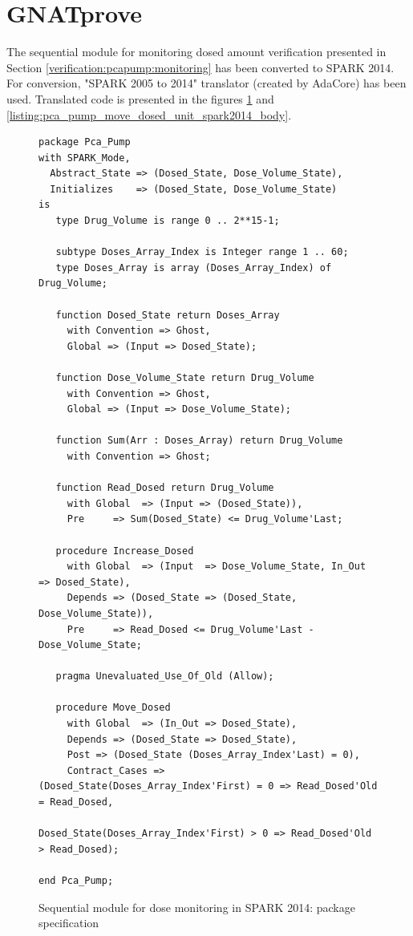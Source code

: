 \section{GNATprove}
\label{verification:gnatprove}

The sequential module for monitoring dosed amount verification presented in Section \ref{verification:pcapump:monitoring} has been converted to SPARK 2014. For conversion, "SPARK 2005 to 2014" translator (created by AdaCore) has been used. Translated code is presented in the figures \ref{listing:pca_pump_move_dosed_unit_spark2014_spec} and \ref{listing:pca_pump_move_dosed_unit_spark2014_body}.

\begin{figure}
\singlespacing
\begin{lstlisting}[language=ada2012, frame=single, gobble=0]
package Pca_Pump
with SPARK_Mode,
  Abstract_State => (Dosed_State, Dose_Volume_State),
  Initializes    => (Dosed_State, Dose_Volume_State)
is
   type Drug_Volume is range 0 .. 2**15-1;

   subtype Doses_Array_Index is Integer range 1 .. 60;
   type Doses_Array is array (Doses_Array_Index) of Drug_Volume;

   function Dosed_State return Doses_Array
     with Convention => Ghost,
     Global => (Input => Dosed_State);

   function Dose_Volume_State return Drug_Volume
     with Convention => Ghost,
     Global => (Input => Dose_Volume_State);

   function Sum(Arr : Doses_Array) return Drug_Volume
     with Convention => Ghost;

   function Read_Dosed return Drug_Volume
     with Global  => (Input => (Dosed_State)),
     Pre     => Sum(Dosed_State) <= Drug_Volume'Last;

   procedure Increase_Dosed
     with Global  => (Input  => Dose_Volume_State, In_Out => Dosed_State),
     Depends => (Dosed_State => (Dosed_State, Dose_Volume_State)),
     Pre     => Read_Dosed <= Drug_Volume'Last - Dose_Volume_State;

   pragma Unevaluated_Use_Of_Old (Allow);

   procedure Move_Dosed
     with Global  => (In_Out => Dosed_State),
     Depends => (Dosed_State => Dosed_State),
     Post => (Dosed_State (Doses_Array_Index'Last) = 0),
     Contract_Cases => (Dosed_State(Doses_Array_Index'First) = 0 => Read_Dosed'Old = Read_Dosed,
                        Dosed_State(Doses_Array_Index'First) > 0 => Read_Dosed'Old > Read_Dosed);
     
end Pca_Pump;
\end{lstlisting}
\doublespacing
\caption{Sequential module for dose monitoring in SPARK 2014: package specification}
\label{listing:pca_pump_move_dosed_unit_spark2014_spec}
\end{figure}

